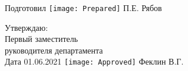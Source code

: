 \documentclass[a4paper,14pt]{article}
\begin{document}
\begin{figure}[H]
	Подготовил
	\hfill
	\texttt{[image: Prepared]}
	П.Е. Рябов
\end{figure}


\begin{figure}[H]
	Утверждаю:\\
	Первый заместитель\\
	руководителя департамента\\
	Дата 01.06.2021
	\hfill
	\texttt{[image: Approved]}
	Феклин В.Г.
\end{figure}
\end{document}
